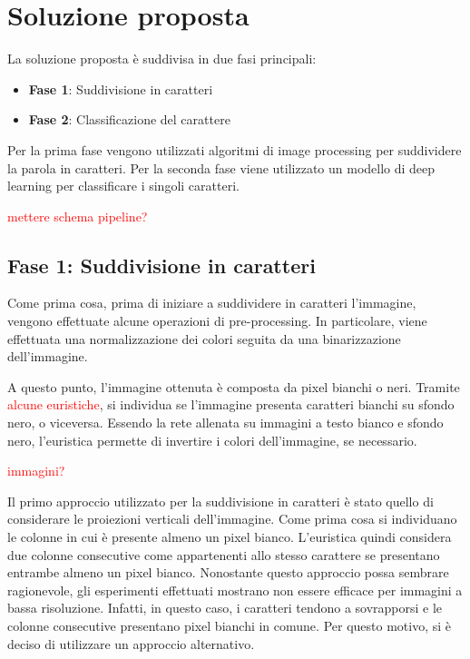 \chapter{Soluzione proposta}

La soluzione proposta è suddivisa in due fasi principali:
\begin{itemize}
	\item \textbf{Fase 1}: Suddivisione in caratteri
	\item \textbf{Fase 2}: Classificazione del carattere
\end{itemize}

Per la prima fase vengono utilizzati algoritmi di image processing per suddividere la parola in caratteri. Per la seconda fase viene utilizzato un modello di deep learning per classificare i singoli caratteri.

\textcolor{red}{mettere schema pipeline?}

\section{Fase 1: Suddivisione in caratteri}

Come prima cosa, prima di iniziare a suddividere in caratteri l'immagine, vengono effettuate alcune operazioni di pre-processing. In particolare, viene effettuata una normalizzazione dei colori seguita da una binarizzazione dell'immagine.

A questo punto, l'immagine ottenuta è composta da pixel bianchi o neri. Tramite \textcolor{red}{alcune euristiche}, si individua se l'immagine presenta caratteri bianchi su sfondo nero, o viceversa. Essendo la rete allenata su immagini a testo bianco e sfondo nero, l'euristica permette di invertire i colori dell'immagine, se necessario.
\newline

\textcolor{red}{immagini?}

Il primo approccio utilizzato per la suddivisione in caratteri è stato quello di considerare le proiezioni verticali dell'immagine. Come prima cosa si individuano le colonne in cui è presente almeno un pixel bianco.
L'euristica quindi considera due colonne consecutive come appartenenti allo stesso carattere se presentano entrambe almeno un pixel bianco. Nonostante questo approccio possa sembrare ragionevole, gli esperimenti effettuati mostrano non essere efficace per immagini a bassa risoluzione. Infatti, in questo caso, i caratteri tendono a sovrapporsi e le colonne consecutive presentano pixel bianchi in comune. Per questo motivo, si è deciso di utilizzare un approccio alternativo.
\newline


